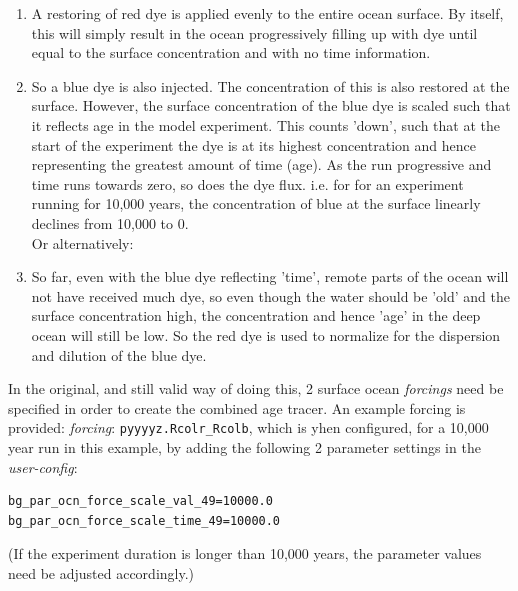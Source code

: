 \documentclass[11pt,fleqn]{book} %
\begin{document}
\begin{enumerate}
\setlength{\itemindent}{.2in}

\vspace{1mm}
\item A restoring of red dye is applied evenly to the entire ocean surface. By itself, this will simply result in the ocean progressively filling up with dye until equal to the surface concentration and with no time information.

\vspace{1mm}
\item So a blue dye is also injected. The concentration of this is also restored at the surface. However, the surface concentration of the blue dye is scaled such that it reflects age in the model experiment. This counts 'down', such that at the start of the experiment the dye is at its highest concentration and hence representing the greatest amount of time (age). As the run progressive and time runs towards zero, so does the dye flux. i.e. for for an experiment running for 10,000 years, the concentration of blue at the surface linearly declines from 10,000 to 0.
\\Or alternatively: 
 
\vspace{1mm}
\item So far, even with the blue dye reflecting 'time', remote parts of the ocean will not have received much dye, so even though the water should be 'old' and the surface concentration high, the concentration and hence 'age' in the deep ocean will still be low. So the red dye is used to normalize for the dispersion and dilution of the blue dye.

\end{enumerate}
\vspace{2mm}

In the original, and still valid way of doing this, 2 surface ocean \textit{forcings} need be specified in order to create the combined age tracer. An example forcing is provided: \textit{forcing}: \texttt{pyyyyz.Rcolr\_Rcolb}, which is yhen configured, for a 10,000 year run in this example, by adding the following 2 parameter settings in the \textit{user-config}:
\vspace{-2pt}\begin{verbatim}
bg_par_ocn_force_scale_val_49=10000.0
bg_par_ocn_force_scale_time_49=10000.0
\end{verbatim}\vspace{-2pt}

\noindent (If the experiment duration is longer than 10,000 years, the parameter values need be adjusted accordingly.)
\end{document}

